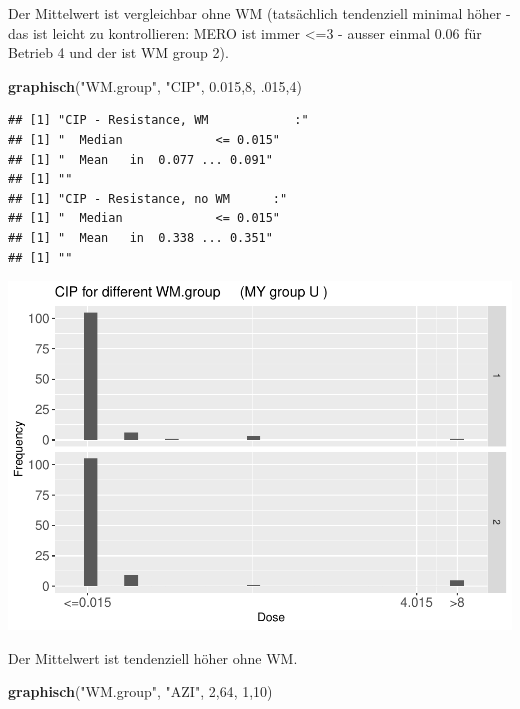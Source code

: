 \documentclass[
]{article}
\newenvironment{Shaded}{\begin{snugshade}}{\end{snugshade}}
\newcommand{\DecValTok}[1]{\textcolor[rgb]{0.00,0.00,0.81}{#1}}
\newcommand{\FloatTok}[1]{\textcolor[rgb]{0.00,0.00,0.81}{#1}}
\newcommand{\KeywordTok}[1]{\textcolor[rgb]{0.13,0.29,0.53}{\textbf{#1}}}
\newcommand{\NormalTok}[1]{#1}
\newcommand{\StringTok}[1]{\textcolor[rgb]{0.31,0.60,0.02}{#1}}
\begin{document}
Der Mittelwert ist vergleichbar ohne WM (tatsächlich tendenziell minimal
höher - das ist leicht zu kontrollieren: MERO ist immer \textless=3 -
ausser einmal 0.06 für Betrieb 4 und der ist WM group 2).

\begin{Shaded}
\begin{Highlighting}[]
  \KeywordTok{graphisch}\NormalTok{(}\StringTok{"WM.group"}\NormalTok{, }\StringTok{"CIP"}\NormalTok{, }\FloatTok{0.015}\NormalTok{,}\DecValTok{8}\NormalTok{, }\FloatTok{.015}\NormalTok{,}\DecValTok{4}\NormalTok{) }
\end{Highlighting}
\end{Shaded}

\begin{verbatim}
## [1] "CIP - Resistance, WM            :"
## [1] "  Median             <= 0.015"
## [1] "  Mean   in  0.077 ... 0.091"
## [1] ""
## [1] "CIP - Resistance, no WM      :"
## [1] "  Median             <= 0.015"
## [1] "  Mean   in  0.338 ... 0.351"
## [1] ""
\end{verbatim}

\includegraphics{Verteilungen_files/figure-latex/unnamed-chunk-33-1.pdf}

Der Mittelwert ist tendenziell höher ohne WM.

\begin{Shaded}
\begin{Highlighting}[]
  \KeywordTok{graphisch}\NormalTok{(}\StringTok{"WM.group"}\NormalTok{, }\StringTok{"AZI"}\NormalTok{, }\DecValTok{2}\NormalTok{,}\DecValTok{64}\NormalTok{, }\DecValTok{1}\NormalTok{,}\DecValTok{10}\NormalTok{)}
\end{Highlighting}
\end{Shaded}
\end{document}
